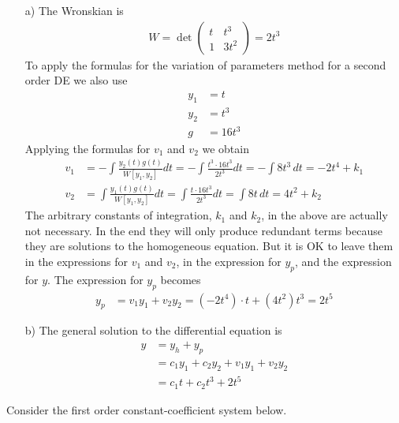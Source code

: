     \ifnum {} {\color{DarkBlue} 
    \begin{enumerate}
        \item[a)] The Wronskian is
    \begin{align}
        W = \det \begin{pmatrix} t&t^3\\1&3t^2\end{pmatrix} = 2t^3
    \end{align}
    To apply the formulas for the variation of parameters method for a second order DE we also use
    \begin{align}
        y_1 & = t \\
        y_2 &= t^3 \\
        g &= 16t^3 
    \end{align}
    Applying the formulas for $v_1$ and $v_2$ we obtain
    \begin{align}
        v_1 &= - \int \frac{y_2(t)g(t)}{W[y_1,y_2]}dt = - \int \frac{t^3 \cdot 16t^3}{2t^3} dt = - \int 8 t^3 \, dt = -2t^4 + k_1\\
        v_2 &= \int \frac{y_1(t)g(t)}{W[y_1,y_2]} dt = \int \frac{t\cdot16t^3}{2t^3} dt = \int 8 t \, dt = 4t^2 + k_2
    \end{align}
    The arbitrary constants of integration, $k_1$ and $k_2$, in the above are actually not necessary. In the end they will only produce redundant terms because they are solutions to the homogeneous equation. But it is OK to leave them in the expressions for $v_1$ and $v_2$, in the expression for $y_p$, and the expression for $y$. The expression for $y_p$ becomes
    \begin{align}
        y_p &= v_1y_1 + v_2y_2 
        = (-2t^4 )\cdot t + (4t^2 ) t^3 
        = 2t^5
    \end{align}
    \item [b)] The general solution to the differential equation is
    \begin{align}
        y &= y_h + y_p \\
        &= c_1y_1 + c_2y_2 + v_1y_1 + v_2y_2 \\
        &= c_1t +c_2t^3 + 2t^5 
    \end{align}
    \end{enumerate}
    } 
    \else 
    \fi    
\fi



\ifnum {}
\ifnum {} \newpage \fi
\question[5] Consider the first order constant-coefficient system below. 
    
